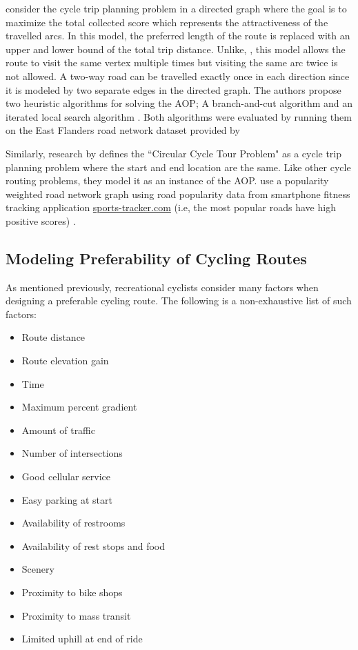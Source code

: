 \documentclass[honors]{union-cs-thesis}
\begin{document}
\citeauthor{verbeeck2014extension} consider the cycle trip planning problem in a directed graph where the goal is to maximize the total collected score which represents the attractiveness of the travelled arcs. In this model, the preferred length of the route is replaced with an upper and lower bound of the total trip distance. Unlike, \citeauthor{souffriau2011planning}, this model allows the route to visit the same vertex multiple times but visiting the same arc twice is not allowed. A two-way road can be travelled exactly once in each direction since it is modeled by two separate edges in the directed graph. The authors propose two heuristic algorithms for solving the AOP; A branch-and-cut algorithm and an iterated local search algorithm \cite{verbeeck2014extension}. Both algorithms were evaluated by running them on the East Flanders road network dataset provided by \citeauthor{souffriau2011planning}

Similarly, research by \citeauthor{bergman2015optimization} defines the ``Circular Cycle Tour Problem" as a cycle trip planning problem where the start and end location are the same. Like other cycle routing problems, they model it as an instance of the AOP. \citeauthor{bergman2015optimization} use a popularity weighted road network graph using road popularity data from smartphone fitness tracking application \href{http://www.sports-tracker.com/}{sports-tracker.com} (i.e, the most popular roads have high positive scores) \cite{bergman2015optimization}.

\subsection{Modeling Preferability of Cycling Routes} \label{routefactors}
As mentioned previously, recreational cyclists consider many factors when designing a preferable cycling route. The following is a non-exhaustive list of such factors:

\begin{multicols}{2}
\begin{itemize}
    \item Route distance
    \item Route elevation gain
    \item Time
    \item Maximum percent gradient
    \item Amount of traffic
    \item Number of intersections
    \item Good cellular service
    \item Easy parking at start
    \item Availability of restrooms
    \item Availability of rest stops and food
    \item Scenery
    \item Proximity to bike shops
    \item Proximity to mass transit
    \item Limited uphill at end of ride
\end{itemize}    
\end{multicols}
\end{document}

